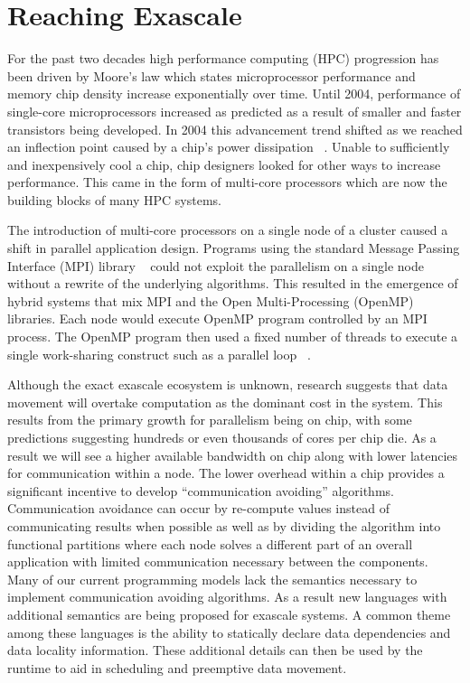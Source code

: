 \section{Reaching Exascale}

For the past two decades high performance computing (HPC) progression has been driven by Moore's law which states microprocessor performance and memory chip density increase exponentially over time. Until 2004, performance of single-core microprocessors increased as predicted as a result of smaller and faster transistors being developed. In 2004 this advancement trend shifted as we reached an inflection point caused by a chip’s power dissipation ~\cite{kogge2013exascale}. Unable to sufficiently and inexpensively cool a chip, chip designers looked for other ways to increase performance. This came in the form of multi-core processors which are now the building blocks of many HPC systems.

The introduction of multi-core processors on a single node of a cluster caused a shift in parallel application design. Programs using the standard Message Passing Interface (MPI) library ~\cite{Snir:1998:MCR:552013} could not exploit the parallelism on a single node without a rewrite of the underlying algorithms. This resulted in the emergence of hybrid systems that mix MPI and the Open Multi-Processing (OpenMP) ~\cite{openmp08} libraries.  Each node would execute OpenMP program controlled by an MPI process. The OpenMP program then used a fixed number of threads to execute a single work-sharing construct such as a parallel loop ~\cite{gropp2013programming}.

Although the exact exascale ecosystem is unknown, research suggests that data movement will overtake computation as the dominant cost in the system.  This results from the primary growth for parallelism being on chip, with some predictions suggesting hundreds or even thousands of cores per chip die. As a result we will see a higher available bandwidth on chip along with lower latencies for communication within a node.  The lower overhead within a chip provides a significant incentive to develop “communication avoiding” algorithms.  Communication avoidance can occur by re-compute values instead of communicating results when possible as well as by dividing the algorithm into functional partitions where each node solves a different part of an overall application with limited communication necessary between the components.
Many of our current programming models lack the semantics necessary to implement communication avoiding algorithms.  As a result new languages with additional semantics are being proposed for exascale systems.  A common theme among these languages is the ability to statically declare data dependencies and data locality information.  These additional details can then be used by the runtime to aid in scheduling and preemptive data movement.

